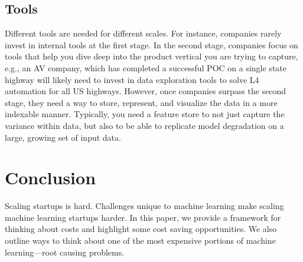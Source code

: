 \documentclass[12pt, letterpaper]{article}
\begin{document}
\subsection{Tools}

Different tools are needed for different scales. For instance, companies rarely invest in internal tools at the first stage. In the second stage, companies focus on tools that help you dive deep into the product vertical you are trying to capture, e.g., an AV company, which has completed a successful POC on a single state highway will likely need to invest in data exploration tools to solve L4 automation for all US highways. However, once companies surpass the second stage, they need a way to store, represent, and visualize the data in a more indexable manner. Typically, you need a feature store to not just capture the variance within data, but also to be able to replicate model degradation on a large, growing set of input data.

\section{Conclusion}
Scaling startups is hard. Challenges unique to machine learning make scaling machine learning startups harder. In this paper, we provide a framework for thinking about costs and highlight some cost saving opportunities. We also outline ways to think about one of the most expensive portions of machine learning---root causing problems. 

\newpage


\end{document}
